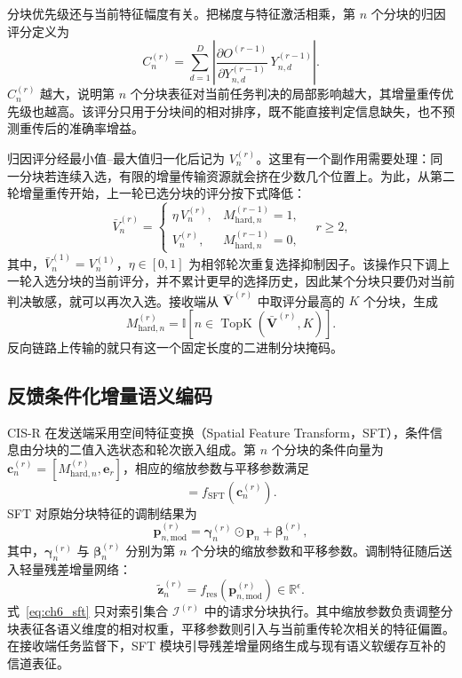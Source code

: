 分块优先级还与当前特征幅度有关。把梯度与特征激活相乘，第 $n$ 个分块的归因评分定义为
\begin{equation}\label{eq:ch6_attr}
C_n^{(r)}=\sum_{d=1}^{D}\left|\frac{\partial O^{(r-1)}}{\partial Y_{n,d}^{(r-1)}}\,Y_{n,d}^{(r-1)}\right|.
\end{equation}
$C_n^{(r)}$ 越大，说明第 $n$ 个分块表征对当前任务判决的局部影响越大，其增量重传优先级也越高。该评分只用于分块间的相对排序，既不能直接判定信息缺失，也不预测重传后的准确率增益。

归因评分经最小值--最大值归一化后记为 $V_n^{(r)}$。这里有一个副作用需要处理：同一分块若连续入选，有限的增量传输资源就会挤在少数几个位置上。为此，从第二轮增量重传开始，上一轮已选分块的评分按下式降低：
\begin{equation}\label{eq:ch6_penalty}
\bar V_n^{(r)}=
\begin{cases}
\eta\,V_n^{(r)}, & M_{\mathrm{hard},n}^{(r-1)}=1,\\[2pt]
V_n^{(r)}, & M_{\mathrm{hard},n}^{(r-1)}=0,
\end{cases}
\quad r\ge2,
\end{equation}
其中，$\bar V_n^{(1)}=V_n^{(1)}$，$\eta\in[0,1]$ 为相邻轮次重复选择抑制因子。该操作只下调上一轮入选分块的当前评分，并不累计更早的选择历史，因此某个分块只要仍对当前判决敏感，就可以再次入选。接收端从 $\bar{\mathbf V}^{(r)}$ 中取评分最高的 $K$ 个分块，生成
\begin{equation}\label{eq:ch6_topk_mask}
M_{\mathrm{hard},n}^{(r)}
=\mathbb{I}\!\left[n\in\operatorname{TopK}\!\left(\bar{\mathbf V}^{(r)},K\right)\right].
\end{equation}
反向链路上传输的就只有这一个固定长度的二进制分块掩码。

\subsection{反馈条件化增量语义编码}
\label{subsec:ch6_refine}

CIS-R 在发送端采用空间特征变换（Spatial Feature Transform，SFT），条件信息由分块的二值入选状态和轮次嵌入组成。第 $n$ 个分块的条件向量为 $\mathbf c_n^{(r)}=[M_{\mathrm{hard},n}^{(r)},\mathbf e_r]$，相应的缩放参数与平移参数满足
\begin{equation}
[\boldsymbol\gamma_n^{(r)},\boldsymbol\beta_n^{(r)}]
=f_{\mathrm{SFT}}(\mathbf c_n^{(r)}).
\end{equation}
SFT 对原始分块特征的调制结果为
\begin{equation}\label{eq:ch6_sft}
\mathbf p_{n,\mathrm{mod}}^{(r)}=\boldsymbol\gamma_n^{(r)}\odot\mathbf p_n+\boldsymbol\beta_n^{(r)},
\end{equation}
其中，$\boldsymbol\gamma_n^{(r)}$ 与 $\boldsymbol\beta_n^{(r)}$ 分别为第 $n$ 个分块的缩放参数和平移参数。调制特征随后送入轻量残差增量网络：
\begin{equation}
\tilde{\mathbf z}_n^{(r)}=f_{\mathrm{res}}\!\left(\mathbf p_{n,\mathrm{mod}}^{(r)}\right)
\in\mathbb R^{\epsilon}.
\end{equation}
式~\eqref{eq:ch6_sft} 只对索引集合 $\mathcal I^{(r)}$ 中的请求分块执行。其中缩放参数负责调整分块表征各语义维度的相对权重，平移参数则引入与当前重传轮次相关的特征偏置。在接收端任务监督下，SFT 模块引导残差增量网络生成与现有语义软缓存互补的信道表征。

